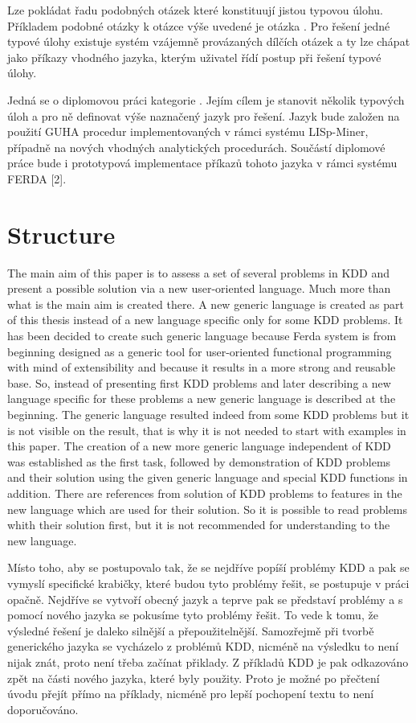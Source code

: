 \documentclass[a4paper,12pt]{book}
\begin{document}
Lze pokládat řadu podobných otázek které konstituují jistou typovou úlohu. Příkladem podobné otázky k otázce výše uvedené je otázka . Pro řešení jedné typové úlohy existuje systém vzájemně provázaných dílčích otázek a ty lze chápat jako příkazy vhodného jazyka, kterým uživatel řídí postup při řešení typové úlohy.

Jedná se o diplomovou práci kategorie . Jejím cílem je stanovit několik typových úloh a pro ně definovat výše naznačený jazyk pro řešení. Jazyk bude založen na použití GUHA procedur implementovaných v rámci systému LISp-Miner, případně na nových vhodných analytických procedurách. Součástí diplomové práce bude i prototypová implementace příkazů tohoto jazyka v rámci systému FERDA [2].

\section*{Structure}
The main aim of this paper is to assess a set of several problems in KDD and present a possible solution via a new user-oriented language. Much more than what is the main aim is created there. A new generic language is created as part of this thesis instead of a new language specific only for some KDD problems. It has been decided to create such generic language because Ferda system is from beginning designed as a generic tool for user-oriented functional programming with mind of extensibility and because it results in a more strong and reusable base. So, instead of presenting first KDD problems and later describing a new language specific for these problems a new generic language is described at the beginning. The generic language resulted indeed from some KDD problems but it is not visible on the result, that is why it is not needed to start with examples in this paper. The creation of a new more generic language independent of KDD was established as the first task, followed by demonstration of KDD problems and their solution using the given generic language and special KDD functions in addition. There are references from solution of KDD problems to features in the new language which are used for their solution. So it is possible to read problems whith their solution first, but it is not recommended for understanding to the new language.

Místo toho, aby se postupovalo tak, že se nejdříve popíší problémy KDD a pak se vymyslí specifické krabičky, které budou tyto problémy řešit, se postupuje v práci opačně. Nejdříve se vytvoří obecný jazyk a teprve pak se představí problémy a s pomocí nového jazyka se pokusíme tyto problémy řešit. To vede k tomu, že výsledné řešení je daleko silnější a přepoužitelnější. Samozřejmě při tvorbě generického jazyka se vycházelo z problémů KDD, nicméně na výsledku to není nijak znát, proto není třeba začínat přiklady. Z příkladů KDD je pak odkazováno zpět na části nového jazyka, které byly použity. Proto je možné po přečtení úvodu přejít přímo na příklady, nicméně pro lepší pochopení textu to není doporučováno.
\end{document}
